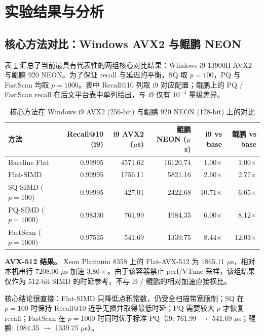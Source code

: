 \documentclass[a4paper,11pt,UTF8]{ctexart}
\begin{document}
\section{实验结果与分析}

\subsection{核心方法对比：Windows AVX2 与鲲鹏 NEON}

表 \ref{tab:core_compare} 汇总了当前最具有代表性的两组核心对比结果：Windows i9-13900H AVX2 与鲲鹏 920 NEON。为了保证 recall 与延迟的平衡，SQ 取 $p=100$，PQ 与 FastScan 均取 $p=1000$。表中 Recall@10 列取 i9 对应配置；鲲鹏上的 PQ / FastScan recall 在后文平台表中单列给出，与 i9 仅有 $10^{-4}$ 量级差异。

\begin{table}[H]
  \centering\small
  \begin{tabular}{lrrrrr}
    \toprule
    方法 & Recall@10 (i9) & i9 AVX2 ($\mu$s) & 鲲鹏 NEON ($\mu$s) & i9 vs base & 鲲鹏 vs base \\
    \midrule
    Baseline Flat & 0.99995 & 4571.62 & 16120.74 & 1.00$\times$ & 1.00$\times$ \\
    Flat-SIMD & 0.99995 & 1756.11 & 5821.16 & 2.60$\times$ & 2.77$\times$ \\
    SQ-SIMD ($p=100$) & 0.99995 & 427.01 & 2422.68 & 10.71$\times$ & 6.65$\times$ \\
    PQ-SIMD ($p=1000$) & 0.98330 & 761.99 & 1984.35 & 6.00$\times$ & 8.12$\times$ \\
    FastScan ($p=1000$) & 0.97535 & 541.69 & 1339.75 & 8.44$\times$ & 12.03$\times$ \\
    \bottomrule
  \end{tabular}
  \caption{核心方法在 Windows i9 AVX2 (256-bit) 与鲲鹏 920 NEON (128-bit) 上的对比}
  \label{tab:core_compare}
\end{table}

\noindent\textbf{AVX-512 结果。} Xeon Platinum 8358 上的 Flat-AVX-512 为 1865.11 $\mu$s，相对本机串行 7208.06 $\mu$s 加速 $3.86\times$。由于该容器禁止 perf/VTune 采样，该组结果仅作为 512-bit SIMD 的时延参考，不与 i9 / 鲲鹏的相对加速直接横比。

核心结论很直接：Flat-SIMD 只降低点积常数，仍受全扫描带宽限制；SQ 在 $p=100$ 时保持 Recall@10 近乎无损并取得最低时延；PQ 需要较大 $p$ 才恢复 recall；FastScan 在 $p=1000$ 时同时优于标准 PQ（i9: 761.99 $\to$ 541.69 $\mu$s；鲲鹏: 1984.35 $\to$ 1339.75 $\mu$s）。
\end{document}
